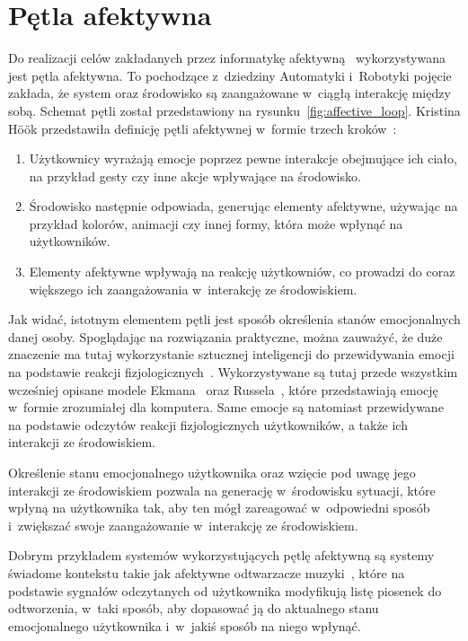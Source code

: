 \section{Pętla afektywna}
Do realizacji celów zakładanych przez informatykę afektywną~\cite{Picard:1997:AC:265013} wykorzystywana jest pętla afektywna. To pochodzące z~dziedziny Automatyki i~Robotyki pojęcie zakłada, że system oraz środowisko są zaangażowane w~ciągłą interakcję między sobą. Schemat pętli został przedstawiony na rysunku~\ref{fig:affective_loop}. Kristina Höök przedstawiła definicję pętli afektywnej w~formie trzech kroków~\cite{affective_loop_experiences}:
\begin{enumerate}
	\item Użytkownicy wyrażają emocje poprzez pewne  interakcje obejmujące ich ciało, na przykład gesty czy inne akcje wpływające na środowisko.
	\item Środowisko następnie odpowiada, generując elementy afektywne, używając na przykład kolorów, animacji czy innej formy, która może wpłynąć na użytkowników.
	\item Elementy afektywne wpływają na reakcję użytkowniów, co prowadzi do coraz większego ich zaangażowania w~interakcję ze środowiskiem.
\end{enumerate}

Jak widać, istotnym elementem pętli jest sposób określenia stanów emocjonalnych danej osoby. Spoglądając na rozwiązania praktyczne, można zauważyć, że duże znaczenie ma tutaj wykorzystanie sztucznej inteligencji do przewidywania emocji na podstawie reakcji fizjologicznych~\cite{emotional_context_geist_2019}. Wykorzystywane są tutaj przede wszystkim wcześniej opisane modele Ekmana~\cite{Ekman1971ConstantsAC} oraz Russela~\cite{circumplex_model_russel_1980}, które przedstawiają emocję w~formie zrozumiałej dla komputera. Same emocje są natomiast przewidywane na podstawie odczytów reakcji fizjologicznych użytkowników, a także ich interakcji ze środowiskiem.

Określenie stanu emocjonalnego użytkownika oraz wzięcie pod uwagę jego interakcji ze środowiskiem pozwala na generację w~środowisku sytuacji, które wpłyną na użytkownika tak, aby ten mógł zareagować w~odpowiedni sposób i~zwiększać swoje zaangażowanie w~interakcję ze środowiskiem. 

Dobrym przykładem systemów wykorzystujących pętlę afektywną są systemy świadome kontekstu takie jak afektywne odtwarzacze muzyki~\cite{Janssen2012,ChrzanowskaInzynierska}, które na podstawie sygnałów odczytanych od użytkownika modyfikują listę piosenek do odtworzenia, w~taki sposób, aby dopasować ją do aktualnego stanu emocjonalnego użytkownika i~w~jakiś sposób na niego wpłynąć.

